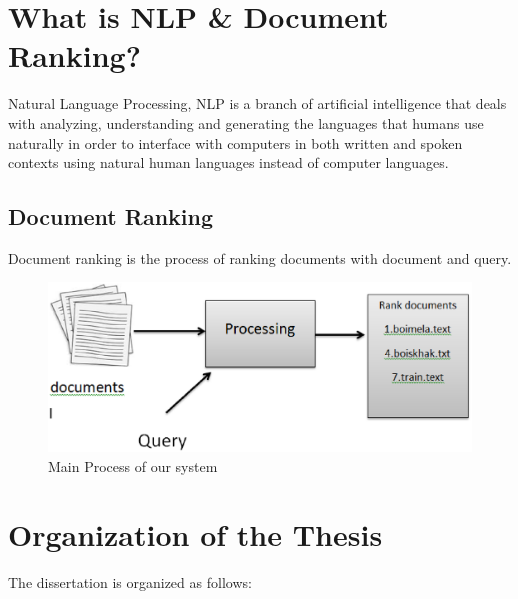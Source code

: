 \section{What is NLP \& Document Ranking?}

Natural Language Processing, NLP is a branch of artificial intelligence that deals with analyzing, understanding and generating the languages that humans use naturally in order to interface with computers in both written and spoken contexts using natural human languages instead of computer languages.

\subsection{Document Ranking}

Document ranking is the process of ranking documents with document and query.

\begin{figure}[htp]
	\centering
		\includegraphics[width=.65\textwidth]{figure/one.eps}
	\caption{Main Process of our system}
	\label{Figure:process}
\end{figure}





\section{Organization of the Thesis}
%
The dissertation is organized as follows: 

